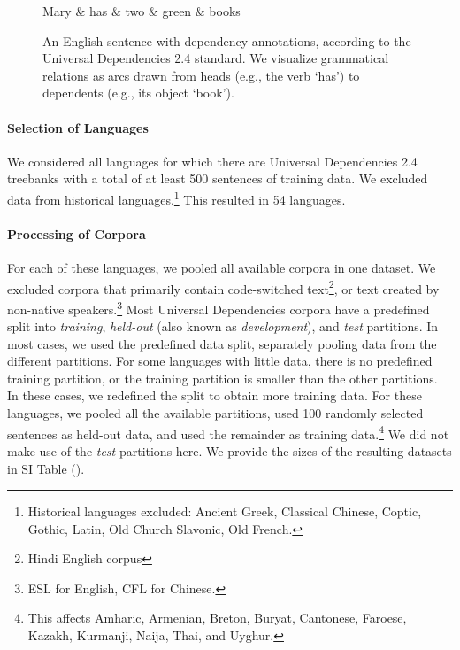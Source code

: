 \begin{figure}
\centering
\begin{dependency}[theme = simple]
   \begin{deptext}[column sep=1em]
Mary \&	 has \& two \& green \& books  \\
   \end{deptext}
\end{dependency}
	\caption{An English sentence with dependency annotations, according to the Universal Dependencies 2.4 standard.
	We visualize grammatical relations as arcs drawn from heads (e.g., the verb `has') to dependents (e.g., its object `book').
	}\label{fig:dependency}
\end{figure}

\paragraph{Selection of Languages}
We considered all languages for which there are Universal Dependencies 2.4 treebanks with a total of at least 500 sentences of training data.
We excluded data from historical languages.\footnote{Historical languages excluded: Ancient Greek, Classical Chinese, Coptic, Gothic, Latin, Old Church Slavonic, Old French.}
This resulted in 54 languages.

\paragraph{Processing of Corpora}
For each of these languages, we pooled all available corpora in one dataset.
We excluded corpora that primarily contain code-switched text\footnote{Hindi English corpus}, or text created by non-native speakers.\footnote{ESL for English, CFL for Chinese.}
Most Universal Dependencies corpora have a predefined split into \emph{training}, \emph{held-out} (also known as \emph{development}), and \emph{test} partitions.
In most cases, we used the predefined data split, separately pooling data from the different partitions. 
For some languages with little data, there is no predefined training partition, or the training partition is smaller than the other partitions.
In these cases, we redefined the split to obtain more training data.
For these languages, we pooled all the available partitions, used 100 randomly selected sentences as held-out data, and used the remainder as training data.\footnote{This affects Amharic, Armenian, Breton, Buryat, Cantonese, Faroese, Kazakh, Kurmanji, Naija, Thai, and Uyghur.}
We did not make use of the \textit{test} partitions here.
We provide the sizes of the resulting datasets in SI Table (\REF).


